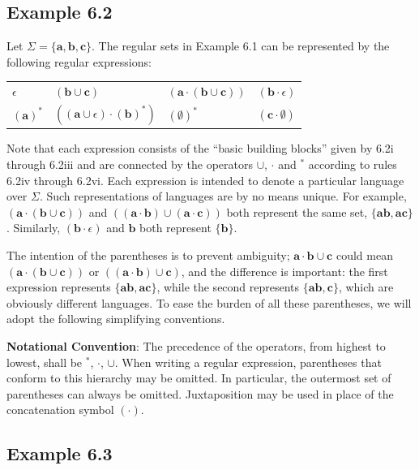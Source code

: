 \subsection*{Example 6.2}

Let $\Sigma=\{\pmb{a},\pmb{b},\pmb{c}\}$. The regular sets in Example 6.1 can be
represented by the following regular expressions:
\begin{center}\begin{tabular}{llll}
$\epsilon$ & $(\pmb{b}\cup\pmb{c})$ & $(\pmb{a}\cdot(\pmb{b}\cup\pmb{c}))$ &
	$(\pmb{b} \cdot \epsilon)$ \\
$(\pmb{a})^*$ & $((\pmb{a}\cup\epsilon)\cdot(\pmb{b})^*)$ & $(\emptyset)^*$ &
	$(\pmb{c}\cdot\emptyset)$
\end{tabular}\end{center}
Note that each expression consists of the ``basic building blocks'' given by
6.2i through 6.2iii and are connected by the operators $\cup$, $\cdot$ and $^*$
according to rules 6.2iv through 6.2vi. Each expression is intended to denote a
particular language over $\Sigma$. Such representations of languages are by no
means unique. For example, $(\pmb{a}\cdot(\pmb{b}\cup\pmb{c}))$ and $((\pmb{a}
\cdot\pmb{b})\cup(\pmb{a}\cdot\pmb{c}))$ both represent the same set,
$\{\pmb{ab},\pmb{ac}\}$. Similarly, $(\pmb{b}\cdot\epsilon)$ and $\pmb{b}$ both
represent $\{\pmb{b}\}$.

The intention of the parentheses is to prevent ambiguity; $\pmb{a}\cdot\pmb{b}
\cup\pmb{c}$ could mean $(\pmb{a}\cdot(\pmb{b}\cup\pmb{c}))$ or $((\pmb{a}\cdot
\pmb{b})\cup\pmb{c})$, and the difference is important: the first expression
represents $\{\pmb{ab},\pmb{ac}\}$, while the second represents $\{\pmb{ab},
\pmb{c}\}$, which are obviously different languages. To ease the burden of all
these parentheses, we will adopt the following simplifying conventions.

\textbf{Notational Convention}: The precedence of the operators, from highest to
lowest, shall be $^*$, $\cdot$, $\cup$. When writing a regular expression,
parentheses that conform to this hierarchy may be omitted. In particular, the
outermost set of parentheses can always be omitted. Juxtaposition may be used in
place of the concatenation symbol $(\cdot)$.

\subsection*{Example 6.3}

